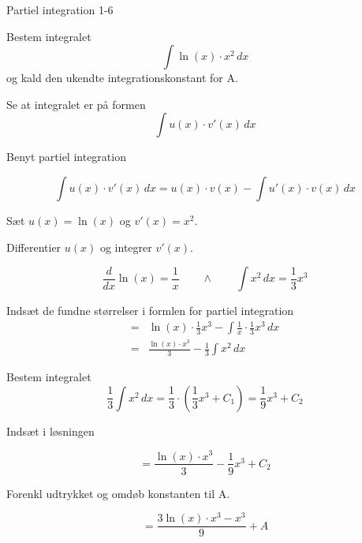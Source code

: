 \documentclass{article}
\begin{document}
\begin{exercise}{Partiel integration 1-6}
	
	
	Bestem integralet
	\[
	\int \ln(x) \cdot x^2 \, dx
	\]
	og kald den ukendte integrationskonstant for A.
	
	
	
	\hint
	
	Se at integralet er på formen
	\[
	\int u(x) \cdot v'(x) \, dx
	\]
	
	\hint
	
	Benyt partiel integration
	
	\hint
	\[
	\int u(x) \cdot v'(x)\, dx = u(x) \cdot v(x) - \int u'(x) \cdot v(x) \, dx
	\]
	\hint
	
	Sæt $u(x) = \ln(x)$ og $v'(x) = x^2$.
	
	
	\hint
	
	Differentier $u(x)$ og integrer $v'(x)$.
	
	\hint
	\[
	\frac{d}{dx}\ln(x)= \frac{1}{x} \qquad \wedge \qquad \int x^2 \, dx = \frac{1}{3}x^3
	\]
	
	\hint
	
	Indsæt de fundne størrelser i formlen for partiel integration
	\begin{align*}
	=& \ln(x) \cdot \frac{1}{3}x^3 - \int \frac{1}{x} \cdot \frac{1}{3}x^3 \, dx\\
	=& \frac{\ln(x) \cdot x^3}{3} - \frac{1}{3} \int x^2 \, dx
	\end{align*}
	
	\hint
	
	Bestem integralet
	\[
	\frac{1}{3} \int x^2 \, dx = \frac{1}{3} \cdot \left( \frac{1}{3}x^3 + C_1 \right)= \frac{1}{9}x^3 + C_2
	\]
	
	\hint
	Indsæt i løsningen 
	
	\hint
	
	\[
	= \frac{\ln(x) \cdot x^3}{3} - \frac{1}{9}x^3 + C_2
	\]
	
	\hint
	
	Forenkl udtrykket og omdøb konstanten til A.
	
	\hint
	
	\[
	= \frac{3\ln(x) \cdot x^3 - x^3}{9}  + A
	\]
	
	
\end{exercise}

\newpage
\end{document}
